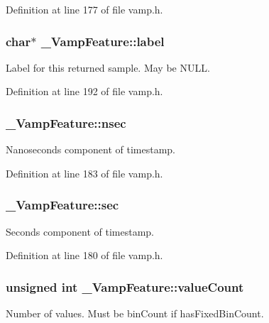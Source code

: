 Definition at line 177 of file vamp.\+h.

\subsubsection[{\texorpdfstring{label}{label}}]{\setlength{\rightskip}{0pt plus 5cm}char$\ast$ \+\_\+\+Vamp\+Feature\+::label}\hypertarget{struct___vamp_feature_a6662b7489a7890cae713bf4e8f6d52cd}{}\label{struct___vamp_feature_a6662b7489a7890cae713bf4e8f6d52cd}
Label for this returned sample. May be N\+U\+LL. 

Definition at line 192 of file vamp.\+h.

\subsubsection[{\texorpdfstring{nsec}{nsec}}]{ \+\_\+\+Vamp\+Feature\+::nsec}\hypertarget{struct___vamp_feature_a8874cb23600c6b10ca6e8a40920d999e}{}\label{struct___vamp_feature_a8874cb23600c6b10ca6e8a40920d999e}
Nanoseconds component of timestamp. 

Definition at line 183 of file vamp.\+h.

\subsubsection[{\texorpdfstring{sec}{sec}}]{ \+\_\+\+Vamp\+Feature\+::sec}\hypertarget{struct___vamp_feature_a31f0b57050e33d082692536097953d9c}{}\label{struct___vamp_feature_a31f0b57050e33d082692536097953d9c}
Seconds component of timestamp. 

Definition at line 180 of file vamp.\+h.

\subsubsection[{\texorpdfstring{value\+Count}{valueCount}}]{\setlength{\rightskip}{0pt plus 5cm}unsigned {\bf int} \+\_\+\+Vamp\+Feature\+::value\+Count}\hypertarget{struct___vamp_feature_ab1ce7c8a2b489e9b0694a967497a29fd}{}\label{struct___vamp_feature_ab1ce7c8a2b489e9b0694a967497a29fd}
Number of values. Must be bin\+Count if has\+Fixed\+Bin\+Count. 


